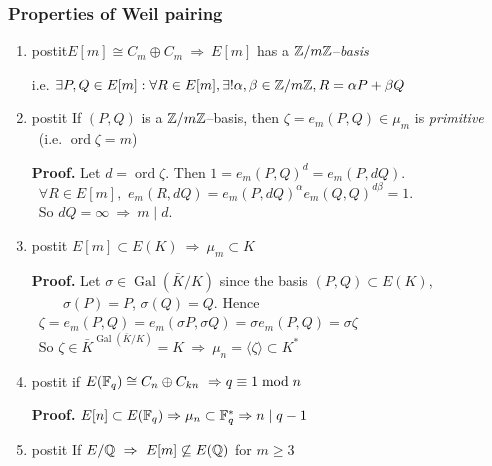 \documentclass[10pt,handout]{beamer} %
\begin{document}
\begin{frame}
\frametitle{Properties of Weil pairing}

\begin{enumerate}[<+-| alert@+>]
  \item \begin{beamercolorbox}[shadow=true,center,rounded=true,wd=\textwidth]{postit}$E[m]\cong C_m\oplus C_m\ \Rightarrow\  E[m]$ has a $\mathbb Z/m\mathbb Z$--\emph{basis}\end{beamercolorbox}
\hspace*{-10mm}i.e. $\exists P,Q\in E[m]: \forall R\in E[m], \exists!\alpha,\beta\in\mathbb Z/m\mathbb Z, R=\alpha P+\beta Q$\hspace*{-15mm}
  \item \begin{beamercolorbox}[shadow=true,center,rounded=true,wd=\textwidth]{postit}
  If $(P, Q)$ is a $\mathbb Z/m\mathbb Z$--basis, then $\zeta=e_m(P,Q)\in\mu_m$ is \emph{primitive}\\\ \hfill \hfill (i.e. $\operatorname{ord}\zeta=m$)
\end{beamercolorbox}
  \textbf{Proof.} Let $d=\operatorname{ord}\zeta$. Then $1=e_m(P, Q)^d=e_m(P, dQ)$.\\
  \qquad\ $\forall R\in E[m],$ $e_m(R,dQ)=e_m(P,dQ)^\alpha e_m(Q,Q)^{d\beta}=1$.\\
  \qquad\ So $dQ=\infty\ \Rightarrow\ m\mid d$.
  \item\begin{beamercolorbox}[shadow=true,center,rounded=true,wd=\textwidth]{postit}
   $E[m]\subset E(K)\ \Rightarrow\ \mu_m\subset K$
\end{beamercolorbox}
  \textbf{Proof.} Let $\sigma\in\operatorname{Gal}(\bar{K}/K)$ %
 since the basis $(P,Q)\subset E(K)$,\\ $\qquad\ \sigma(P)=P$, $\sigma(Q)=Q$. Hence\\
 \qquad\ $\zeta= e_m(P,Q)=e_m(\sigma P,\sigma Q)=\sigma e_m(P,Q)=\sigma\zeta$\\
 \qquad\ So $\zeta\in \bar{K}^{\operatorname{Gal}(\bar{K}/K)}=K\ \Rightarrow\ \mu_n=\langle\zeta\rangle\subset K^*$
  \item \begin{beamercolorbox}[shadow=true,center,rounded=true,wd=\textwidth]{postit}
  if $E(\mathbb F_q)\cong C_n\oplus C_{kn}\ \Rightarrow q\equiv1\bmod n$
  \end{beamercolorbox}
  \textbf{Proof.} $E[n]\subset E(\mathbb F_q)\Rightarrow \mu_n\subset\mathbb F_q^*\Rightarrow n\mid q-1$
  \item \begin{beamercolorbox}[shadow=true,center,rounded=true,wd=\textwidth]{postit}
  If $E/\Q\ \Rightarrow\ E[m]\not\subseteq E(\Q)$ for $m\ge3$\end{beamercolorbox}
\end{enumerate}
\end{frame}
\end{document}
